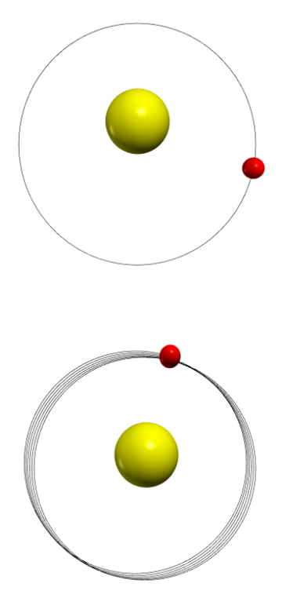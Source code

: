 \documentclass[12pt, UK english]{iopart}
\begin{document}
\begin{figure}[htb]
	\centering
	\begin{subfigure}[b]{0.3\textwidth}
		\includegraphics[width=\textwidth]{figs/a0T5dt20.png}
		\caption{\label{fig:MercuryOrbit-a0-small}}
	\end{subfigure}
	~
	\begin{subfigure}[b]{0.3\textwidth}
		\includegraphics[width=\textwidth]{figs/a6T5dt20.png}

\end{subfigure}
\end{figure}
\end{document}
